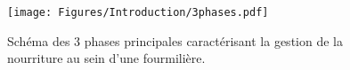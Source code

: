 %
%
%
%
%

\begin{figure}[h]
\centering
\texttt{[image: Figures/Introduction/3phases.pdf]}
\caption{Schéma des 3 phases principales caractérisant la gestion de la nourriture au sein d'une fourmilière.}
\label{3phases}
\end{figure}



